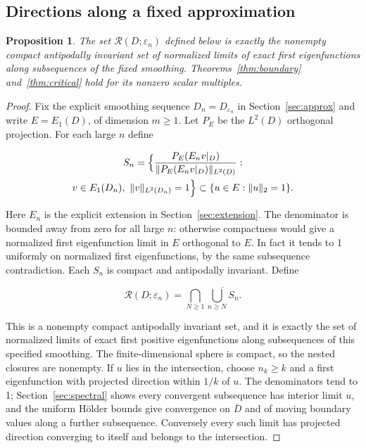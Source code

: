 \documentclass[11pt]{article}
\newtheorem{proposition}[theorem]{Proposition}
\theoremstyle{definition}
\theoremstyle{remark}
\numberwithin{equation}{section}
\begin{document}
\subsection{Directions along a fixed approximation}\label{sec:reached}
\begin{proposition}\label{prop:reached}
The set $\mathcal R(D;\varepsilon_n)$ defined below is exactly the nonempty compact antipodally invariant set of normalized limits of exact first eigenfunctions along subsequences of the fixed smoothing. Theorems~\ref{thm:boundary} and~\ref{thm:critical} hold for its nonzero scalar multiples.
\end{proposition}
\begin{proof}
Fix the explicit smoothing sequence $D_n=D_{\varepsilon_n}$ in Section~\ref{sec:approx} and write $E=E_1(D)$, of dimension $m\ge1$. Let $P_E$ be the $L^2(D)$ orthogonal projection. For each large $n$ define

\begin{equation}\label{eq:src-7-01}
\begin{gathered}
S_n=\Bigl\{\frac{P_E(E_nv|_D)}{\|P_E(E_nv|_D)\|_{L^2(D)}}: \\
v\in E_1(D_n),\ \|v\|_{L^2(D_n)}=1\Bigr\}\subset\{u\in E:\|u\|_2=1\}.
\end{gathered}
\end{equation}

Here $E_n$ is the explicit extension in Section~\ref{sec:extension}. The denominator is bounded away from zero for all large $n$: otherwise compactness would give a normalized first eigenfunction limit in $E$ orthogonal to $E$. In fact it tends to 1 uniformly on normalized first eigenfunctions, by the same subsequence contradiction. Each $S_n$ is compact and antipodally invariant. Define

\begin{equation}\label{eq:src-7-02}
\mathcal R(D;\varepsilon_n)=\bigcap_{N\ge1}\overline{\bigcup_{n\ge N}S_n}.
\end{equation}

This is a nonempty compact antipodally invariant set, and it is exactly the set of normalized limits of exact first positive eigenfunctions along subsequences of this specified smoothing. The finite-dimensional sphere is compact, so the nested closures are nonempty. If $u$ lies in the intersection, choose $n_k\ge k$ and a first eigenfunction with projected direction within $1/k$ of $u$. The denominators tend to 1; Section~\ref{sec:spectral} shows every convergent subsequence has interior limit $u$, and the uniform H\"older bounds give convergence on $\overline D$ and of moving boundary values along a further subsequence. Conversely every such limit has projected direction converging to itself and belongs to the intersection.


\end{proof}
\end{document}

